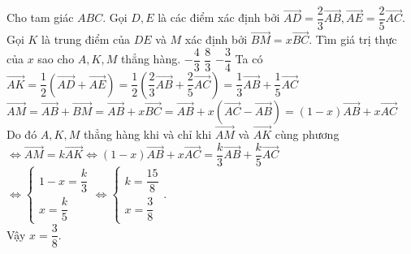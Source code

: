 \begin{ex}%
	Cho tam giác $ABC$. Gọi $D, E$ là các điểm xác định bởi $\overrightarrow{AD} = \dfrac{2}{3}\overrightarrow{AB},\overrightarrow{AE} = \dfrac{2}{5}\overrightarrow{AC}$. Gọi $K$ là trung điểm của $DE$ và $M$ xác định bởi $\overrightarrow{BM} = x\overrightarrow{BC}$. Tìm giá trị thực của $x$ sao cho $A,K,M$ thẳng hàng.
	{$-\dfrac{4}{3}$}
	{$\dfrac{8}{3}$}
	{$-\dfrac{3}{4}$}
	\loigiai
	{Ta có $\overrightarrow {AK}  = \dfrac{1}{2}\left( {\overrightarrow {AD}  + \overrightarrow {AE} } \right) = \dfrac{1}{2}\left( {\dfrac{2}{3}\overrightarrow {AB}  + \dfrac{2}{5}\overrightarrow {AC} } \right) = \dfrac{1}{3}\overrightarrow {AB}  + \dfrac{1}{5}\overrightarrow {AC} $\\
		$\overrightarrow {AM}  = \overrightarrow {AB}  + \overrightarrow {BM}  = \overrightarrow {AB}  + x\overrightarrow {BC}  = \overrightarrow {AB}  + x\left( {\overrightarrow {AC}  - \overrightarrow {AB} } \right) = \left( {1 - x} \right)\overrightarrow {AB}  + x\overrightarrow {AC} $\\
		Do đó $A,K,M$  thẳng hàng khi và chỉ khi $\overrightarrow{AM}$ và $\overrightarrow{AK}$ cùng phương\\
		$ \Leftrightarrow \overrightarrow {AM}  = k\overrightarrow {AK}  \Leftrightarrow \left( {1 - x} \right)\overrightarrow {AB}  + x\overrightarrow {AC}  = \dfrac{k}{3}\overrightarrow {AB}  + \dfrac{k}{5}\overrightarrow {AC} $\\
		$ \Leftrightarrow \left\{ \begin{array}{l}
		1 - x = \dfrac{k}{3}\\
		x = \dfrac{k}{5}
		\end{array} \right. \Leftrightarrow \left\{ \begin{array}{l}
		k = \dfrac{{15}}{8}\\
		x = \dfrac{3}{8}
		\end{array} \right.$.\\
		Vậy $x=\dfrac{3}{8}$.}
\end{ex}
